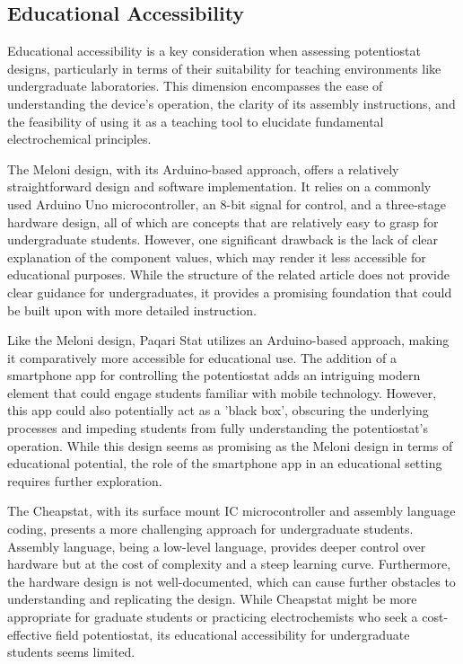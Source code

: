\documentclass{article}
\begin{document}
\subsection*{Educational Accessibility}
Educational accessibility is a key consideration when assessing potentiostat designs, particularly in terms of their suitability for teaching environments like undergraduate laboratories. This dimension encompasses the ease of understanding the device's operation, the clarity of its assembly instructions, and the feasibility of using it as a teaching tool to elucidate fundamental electrochemical principles.

The Meloni design, with its Arduino-based approach, offers a relatively straightforward design and software implementation. It relies on a commonly used Arduino Uno microcontroller, an 8-bit signal for control, and a three-stage hardware design, all of which are concepts that are relatively easy to grasp for undergraduate students. However, one significant drawback is the lack of clear explanation of the component values, which may render it less accessible for educational purposes. While the structure of the related article does not provide clear guidance for undergraduates, it provides a promising foundation that could be built upon with more detailed instruction.

Like the Meloni design, Paqari Stat utilizes an Arduino-based approach, making it comparatively more accessible for educational use. The addition of a smartphone app for controlling the potentiostat adds an intriguing modern element that could engage students familiar with mobile technology. However, this app could also potentially act as a 'black box', obscuring the underlying processes and impeding students from fully understanding the potentiostat's operation. While this design seems as promising as the Meloni design in terms of educational potential, the role of the smartphone app in an educational setting requires further exploration.

The Cheapstat, with its surface mount IC microcontroller and assembly language coding, presents a more challenging approach for undergraduate students. Assembly language, being a low-level language, provides deeper control over hardware but at the cost of complexity and a steep learning curve. Furthermore, the hardware design is not well-documented, which can cause further obstacles to understanding and replicating the design. While Cheapstat might be more appropriate for graduate students or practicing electrochemists who seek a cost-effective field potentiostat, its educational accessibility for undergraduate students seems limited.
\end{document}
